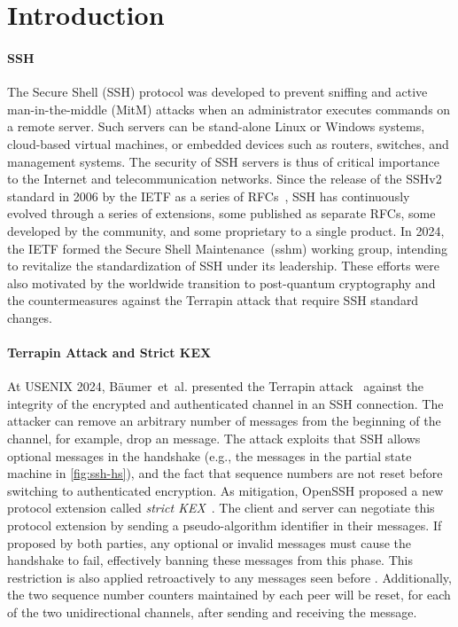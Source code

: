\section{Introduction}
\label{sec:intro}

\paragraph{SSH}

The Secure Shell (SSH) protocol was developed to prevent sniffing and active man-in-the-middle (MitM) attacks when an administrator executes commands on a remote server. Such servers can be stand-alone Linux or Windows systems, cloud-based virtual machines, or embedded devices such as routers, switches, and management systems. The security of SSH servers is thus of critical importance to the Internet and telecommunication networks. Since the release of the SSHv2 standard in 2006 by the IETF as a series of RFCs~\cite{rfc4250,rfc4251,rfc4252,rfc4253,rfc4254}, SSH has continuously evolved through a series of extensions, some published as separate RFCs, some developed by the community, and some proprietary to a single product. In 2024, the IETF formed the Secure Shell Maintenance~(sshm) working group, intending to revitalize the standardization of SSH under its leadership. These efforts were also motivated by the worldwide transition to post-quantum cryptography and the countermeasures against the Terrapin attack that require SSH standard changes.

\paragraph{Terrapin Attack and Strict KEX}

At USENIX 2024, Bäumer~et~al. presented the Terrapin attack~\cite{USENIX:BauBriSch24} against the integrity of the encrypted and authenticated channel in an SSH connection. The attacker can remove an arbitrary number of messages from the beginning of the channel, for example, drop an \msgextinfo message. The attack exploits that SSH allows optional messages in the handshake (e.g., the \msgignore messages in the partial state machine in \autoref{fig:ssh-hs}), and the fact that sequence numbers are not reset before switching to authenticated encryption. As mitigation, OpenSSH proposed a new protocol extension called \emph{strict KEX}~\cite{ietf-sshm-strict-kex-00}. The client and server can negotiate this protocol extension by sending a pseudo-algorithm identifier in their \msgkexinit messages. If proposed by both parties, any optional or invalid messages must cause the handshake to fail, effectively banning these messages from this phase. This restriction is also applied retroactively to any messages seen before \msgkexinit. Additionally, the two sequence number counters maintained by each peer will be reset, for each of the two unidirectional channels, after sending and receiving the \msgnewkeys message.

